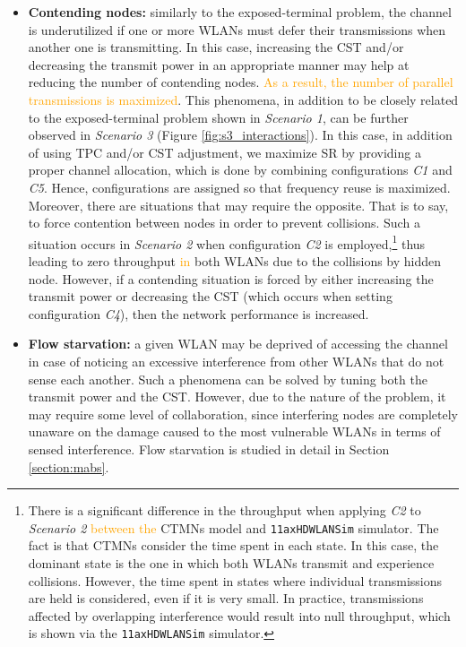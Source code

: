 \documentclass[preprint,12pt]{elsarticle}
\begin{document}
\begin{itemize}
	\item \textbf{Contending nodes:} similarly to the exposed-terminal problem, the channel is underutilized if one or more WLANs must defer their transmissions when another one is transmitting. In this case, increasing the CST and/or decreasing the transmit power in an appropriate manner may help at reducing the number of contending nodes. \textcolor{orange}{As a result, the number of parallel transmissions is maximized}. This phenomena, in addition to be closely related to the exposed-terminal problem shown in \emph{Scenario 1}, can be further observed in \emph{Scenario 3} (Figure \ref{fig:s3_interactions}). In this case, in addition of using TPC and/or CST adjustment, we maximize SR by providing a proper channel allocation, which is done by combining configurations \emph{C1} and \emph{C5}. Hence, configurations are assigned so that frequency reuse is maximized. Moreover, there are situations that may require the opposite. That is to say, to force contention between nodes in order to prevent collisions. Such a situation occurs in \emph{Scenario 2} when configuration \emph{C2} is employed,\footnote{There is a significant difference in the throughput when applying \emph{C2} to \emph{Scenario 2} \textcolor{orange}{between the} CTMNs model and \texttt{11axHDWLANSim} simulator. The fact is that CTMNs consider the time spent in each state. In this case, the dominant state is the one in which both WLANs transmit and experience collisions. However, the time spent in states where individual transmissions are held is considered, even if it is very small. In practice, transmissions affected by overlapping interference would result into null throughput, which is shown via the \texttt{11axHDWLANSim} simulator.} thus leading to zero throughput \textcolor{orange}{in} both WLANs due to the collisions by hidden node. However, if a contending situation is forced by either increasing the transmit power or decreasing the CST (which occurs when setting configuration \emph{C4}), then the network performance is increased. 		
	\item \textbf{Flow starvation:} a given WLAN may be deprived of accessing the channel in case of noticing an excessive interference from other WLANs that do not sense each another. Such a phenomena can be solved by tuning both the transmit power and the CST. However, due to the nature of the problem, it may require some level of collaboration, since interfering nodes are completely unaware on the damage caused to the most vulnerable WLANs in terms of sensed interference. Flow starvation is studied in detail in Section \ref{section:mabs}.

\end{itemize}
\end{document}
